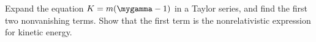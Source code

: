 Expand the equation $K = m(\mygamma-1)$ in a Taylor series, and find the
first two nonvanishing terms. Show that the first term is the nonrelativistic
expression for kinetic energy.

